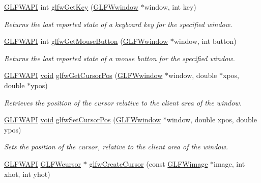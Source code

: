 \begin{DoxyCompactItemize}
\mbox{\hyperlink{glfw3_8h_a56da5036b2cc259351ae22fd6439bb47}{G\+L\+F\+W\+A\+PI}} int \mbox{\hyperlink{group__input_ga7d8ad8ffaf272808f04e1d5d33ec8859}{glfw\+Get\+Key}} (\mbox{\hyperlink{group__window_ga3c96d80d363e67d13a41b5d1821f3242}{G\+L\+F\+Wwindow}} $\ast$window, int key)
\begin{DoxyCompactList}\small\item\em Returns the last reported state of a keyboard key for the specified window. \end{DoxyCompactList}\item 
\mbox{\hyperlink{glfw3_8h_a56da5036b2cc259351ae22fd6439bb47}{G\+L\+F\+W\+A\+PI}} int \mbox{\hyperlink{group__input_ga6da5efb04f700c312a57a169fa9393a0}{glfw\+Get\+Mouse\+Button}} (\mbox{\hyperlink{group__window_ga3c96d80d363e67d13a41b5d1821f3242}{G\+L\+F\+Wwindow}} $\ast$window, int button)
\begin{DoxyCompactList}\small\item\em Returns the last reported state of a mouse button for the specified window. \end{DoxyCompactList}\item 
\mbox{\hyperlink{glfw3_8h_a56da5036b2cc259351ae22fd6439bb47}{G\+L\+F\+W\+A\+PI}} \mbox{\hyperlink{glad_8h_a950fc91edb4504f62f1c577bf4727c29}{void}} \mbox{\hyperlink{group__input_gad289438eb7cf53d11eca685373f44105}{glfw\+Get\+Cursor\+Pos}} (\mbox{\hyperlink{group__window_ga3c96d80d363e67d13a41b5d1821f3242}{G\+L\+F\+Wwindow}} $\ast$window, double $\ast$xpos, double $\ast$ypos)
\begin{DoxyCompactList}\small\item\em Retrieves the position of the cursor relative to the client area of the window. \end{DoxyCompactList}\item 
\mbox{\hyperlink{glfw3_8h_a56da5036b2cc259351ae22fd6439bb47}{G\+L\+F\+W\+A\+PI}} \mbox{\hyperlink{glad_8h_a950fc91edb4504f62f1c577bf4727c29}{void}} \mbox{\hyperlink{group__input_gaaf152cc93418acb0ba342e3f4af922bc}{glfw\+Set\+Cursor\+Pos}} (\mbox{\hyperlink{group__window_ga3c96d80d363e67d13a41b5d1821f3242}{G\+L\+F\+Wwindow}} $\ast$window, double xpos, double ypos)
\begin{DoxyCompactList}\small\item\em Sets the position of the cursor, relative to the client area of the window. \end{DoxyCompactList}\item 
\mbox{\hyperlink{glfw3_8h_a56da5036b2cc259351ae22fd6439bb47}{G\+L\+F\+W\+A\+PI}} \mbox{\hyperlink{glfw3_8h_a89261ae18c75e863aaf2656ecdd238f4}{G\+L\+F\+Wcursor}} $\ast$ \mbox{\hyperlink{group__input_gac0f0f691f2d110f9acfb4bfe07f1216c}{glfw\+Create\+Cursor}} (const \mbox{\hyperlink{struct_g_l_f_wimage}{G\+L\+F\+Wimage}} $\ast$image, int xhot, int yhot)

\end{DoxyCompactItemize}
